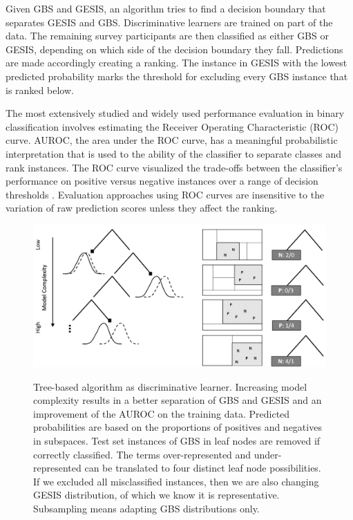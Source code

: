 Given GBS and GESIS, an algorithm tries to find a decision boundary that separates GESIS and GBS. Discriminative learners are trained on part of the data. The remaining survey participants are then classified as either GBS or GESIS, depending on which side of the decision boundary they fall. Predictions are made accordingly creating a ranking. The instance in GESIS with the lowest predicted probability marks the threshold for excluding every GBS instance that is ranked below.

The most extensively studied and widely used performance evaluation in binary classiﬁcation involves estimating the Receiver Operating Characteristic (ROC) curve. AUROC, the area under the ROC curve, has a meaningful probabilistic interpretation that is used to the ability of the classiﬁer to separate classes and rank instances. The ROC curve visualized the trade-offs between the classifier's performance on positive versus negative instances over a range of decision thresholds \cite{roc}. Evaluation approaches using ROC curves are insensitive to the variation of raw prediction scores unless they affect the ranking.

\begin{figure}[ht]
	\begin{center}
		\includegraphics[scale=0.32,angle=0]{fig/tree}
		\label{project}
		\caption{Tree-based algorithm as discriminative learner. Increasing model complexity results in a better separation of GBS and GESIS and an improvement of the AUROC on the training data. Predicted probabilities are based on the proportions of positives and negatives in subspaces. Test set instances of GBS in leaf nodes are removed if correctly classified. The terms over-represented and under-represented can be translated to four distinct leaf node possibilities. If we excluded all misclassified instances, then we are also changing GESIS distribution, of which we know it is representative. Subsampling means adapting GBS distributions only.}
	\end{center}
\end{figure}


